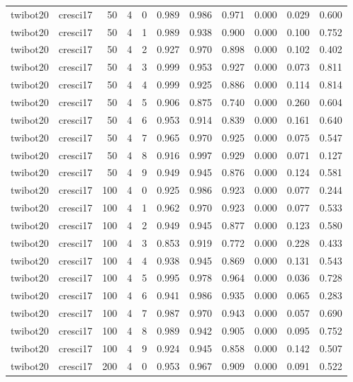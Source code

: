 \begin{tabular}{llrrrrrrrrr}
twibot20 & cresci17 & 50 & 4 & 0 & 0.989 & 0.986 & 0.971 & 0.000 & 0.029 & 0.600 \\
twibot20 & cresci17 & 50 & 4 & 1 & 0.989 & 0.938 & 0.900 & 0.000 & 0.100 & 0.752 \\
twibot20 & cresci17 & 50 & 4 & 2 & 0.927 & 0.970 & 0.898 & 0.000 & 0.102 & 0.402 \\
twibot20 & cresci17 & 50 & 4 & 3 & 0.999 & 0.953 & 0.927 & 0.000 & 0.073 & 0.811 \\
twibot20 & cresci17 & 50 & 4 & 4 & 0.999 & 0.925 & 0.886 & 0.000 & 0.114 & 0.814 \\
twibot20 & cresci17 & 50 & 4 & 5 & 0.906 & 0.875 & 0.740 & 0.000 & 0.260 & 0.604 \\
twibot20 & cresci17 & 50 & 4 & 6 & 0.953 & 0.914 & 0.839 & 0.000 & 0.161 & 0.640 \\
twibot20 & cresci17 & 50 & 4 & 7 & 0.965 & 0.970 & 0.925 & 0.000 & 0.075 & 0.547 \\
twibot20 & cresci17 & 50 & 4 & 8 & 0.916 & 0.997 & 0.929 & 0.000 & 0.071 & 0.127 \\
twibot20 & cresci17 & 50 & 4 & 9 & 0.949 & 0.945 & 0.876 & 0.000 & 0.124 & 0.581 \\
twibot20 & cresci17 & 100 & 4 & 0 & 0.925 & 0.986 & 0.923 & 0.000 & 0.077 & 0.244 \\
twibot20 & cresci17 & 100 & 4 & 1 & 0.962 & 0.970 & 0.923 & 0.000 & 0.077 & 0.533 \\
twibot20 & cresci17 & 100 & 4 & 2 & 0.949 & 0.945 & 0.877 & 0.000 & 0.123 & 0.580 \\
twibot20 & cresci17 & 100 & 4 & 3 & 0.853 & 0.919 & 0.772 & 0.000 & 0.228 & 0.433 \\
twibot20 & cresci17 & 100 & 4 & 4 & 0.938 & 0.945 & 0.869 & 0.000 & 0.131 & 0.543 \\
twibot20 & cresci17 & 100 & 4 & 5 & 0.995 & 0.978 & 0.964 & 0.000 & 0.036 & 0.728 \\
twibot20 & cresci17 & 100 & 4 & 6 & 0.941 & 0.986 & 0.935 & 0.000 & 0.065 & 0.283 \\
twibot20 & cresci17 & 100 & 4 & 7 & 0.987 & 0.970 & 0.943 & 0.000 & 0.057 & 0.690 \\
twibot20 & cresci17 & 100 & 4 & 8 & 0.989 & 0.942 & 0.905 & 0.000 & 0.095 & 0.752 \\
twibot20 & cresci17 & 100 & 4 & 9 & 0.924 & 0.945 & 0.858 & 0.000 & 0.142 & 0.507 \\
twibot20 & cresci17 & 200 & 4 & 0 & 0.953 & 0.967 & 0.909 & 0.000 & 0.091 & 0.522 \\

\end{tabular}
